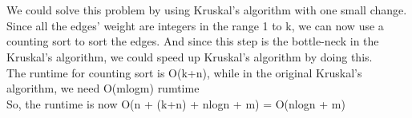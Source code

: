 \documentclass[12pt]{article}
\begin{document}
\pagebreak

\section{}
We could solve this problem by using Kruskal's algorithm with one small change. Since all the edges' weight are integers in the range 1 to k, we can now use a counting sort to sort the edges. And since this step is the bottle-neck in the Kruskal's algorithm, we could speed up Kruskal's algorithm by doing this.\\

The runtime for counting sort is O(k+n), while in the original Kruskal's algorithm, we need O(mlogm) rumtime\\

So, the runtime is now O(n + (k+n) + nlogn + m) = O(nlogn + m)
\end{document}
